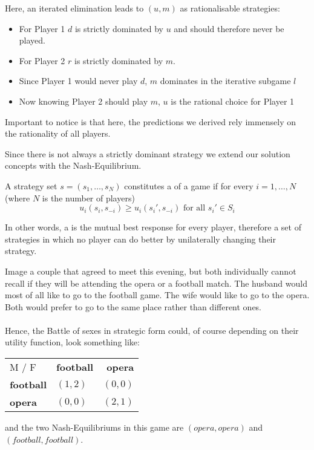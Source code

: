 Here, an iterated elimination leads to $(u, m)$ as rationalisable strategies:
\begin{itemize}
	\item For Player 1 $d$ is strictly dominated by $u$ and should therefore never be played.
	\item For Player 2 $r$ is strictly dominated by $m$.
	\item Since Player 1 would never play $d$, $m$ dominates in the iterative subgame $l$
	\item Now knowing Player 2 should play $m$, $u$ is the rational choice for Player 1
\end{itemize} 	

Important to notice is that here, the predictions we derived rely immensely on the rationality of all players.

Since there is not always a strictly dominant strategy we extend our solution concepts with the Nash-Equilibrium.

\begin{definition} \label{nashequilibrium} 
A strategy set $s = (s_{1}, \dotsc, s_{N})$ constitutes a  of a game if for every $i = 1, \dotsc, N$ (where $N$ is the number of players)
	\[ u_{i}(s_{i}, s_{-i}) \geq u_{i}(s_{i}', s_{-i}) \text{ for all } s_{i}' \in S_{i} \]
\end{definition}

In other words, a  is the mutual best response for every player, therefore a set of strategies in which no player can do better by unilaterally changing their strategy. \\

\begin{example} \label{battleofthesexes} 
		Image a couple that agreed to meet this evening, but both individually cannot recall if they will be attending the opera or a football match. The husband would most of all like to go to the football game. The wife would like to go to the opera. Both would prefer to go to the same place rather than different ones. \\ \\
		Hence, the Battle of sexes in strategic form could, of course depending on their utility function, look something like:
		\begin{center}
			\begin{tabular}{|l|l|r|}
				\hline\hline
  					M / F & \textbf{football} & \textbf{opera} \\
         				\cline{1-3}
   					\textbf{football} & $(1, 2)$ & $(0, 0)$ 	\arrayrulewidth2pt \\
            			\cline{1-3}
   					\textbf{opera} & $(0, 0)$ & $(2, 1)$ \\ \hline\hline
			\end{tabular}	
		\end{center}
		
		and the two Nash-Equilibriums in this game are $(opera, opera)$ and $(football, football)$.
\end{example}

